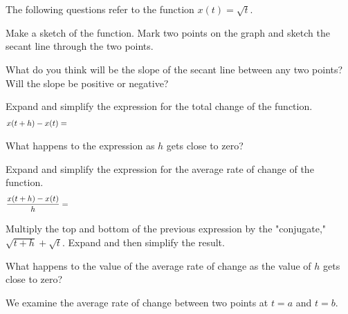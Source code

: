 \begin{problem}
    \item The following questions refer to the function $x(t)=\sqrt{t}$.
      \begin{subproblem}
        \item  Make a sketch of the function. Mark two points on the
          graph and sketch the secant line through the two points.
          \vfill
        \item What do you think will be the slope of the secant line
          between any two points? Will the slope be positive or negative?
          \vspace{1em}
        \item Expand and simplify the expression for the total change
          of the function.
          \begin{eqnarray*}
            x(t+h)-x(t) & = & \hskip \textwidth
          \end{eqnarray*}
        \item What happens to the expression as $h$ gets close to zero?
        \item Expand and simplify the expression for the average rate
          of change of the function.
        \begin{eqnarray*}
          \frac{x(t+h)-x(t)}{h} & = & \hskip \textwidth
        \end{eqnarray*}
        \vspace{1em}
        \item Multiply the top and bottom of the previous expression
          by the "conjugate," ${\displaystyle \sqrt{t+h}+\sqrt{t}}$.
          Expand and then simplify the result.
          \vfill
      \item What happens to the value of the average rate of change as
        the value of $h$ gets close to zero?
        \vspace{3em}
      \end{subproblem}

      \clearpage

    \item We examine the average rate of change between two points at
      $t=a$ and $t=b$.

      \scalebox{0.7}{}


\end{problem}
